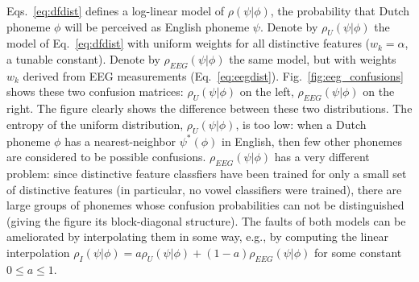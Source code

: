 Eqs.~\ref{eq:dfdist} defines a log-linear model of $\rho(\psi|\phi)$, the
probability that Dutch phoneme $\phi$ will be perceived as English
phoneme $\psi$.  Denote by $\rho_U(\psi|\phi)$ the model of
Eq.~\ref{eq:dfdist} with uniform weights for all distinctive features
($w_k=\alpha$, a tunable constant).  Denote by $\rho_{EEG}(\psi|\phi)$ the
same model, but with weights $w_k$ derived from EEG measurements
(Eq.~\ref{eq:eegdist}).  Fig.~\ref{fig:eeg_confusions} shows these
two confusion matrices: $\rho_U(\psi|\phi)$ on the left,
$\rho_{EEG}(\psi|\phi)$ on the right.  The figure clearly shows the
difference between these two distributions.  The entropy of the
uniform distribution, $\rho_U(\psi|\phi)$, is too low: when a Dutch
phoneme $\phi$ has a nearest-neighbor $\psi^*(\phi)$ in English, then
few other phonemes are considered to be possible confusions.
$\rho_{EEG}(\psi|\phi)$ has a very different problem: since distinctive
feature classfiers have been trained for only a small set of
distinctive features (in particular, no vowel classifiers were
trained), there are large groups of phonemes whose confusion
probabilities can not be distinguished (giving the figure its
block-diagonal structure).  The faults of both models can be
ameliorated by interpolating them in some way, e.g., by computing the
linear interpolation
$\rho_I(\psi|\phi)=a\rho_U(\psi|\phi)+(1-a)\rho_{EEG}(\psi|\phi)$ for some
constant $0\le a\le 1$.

